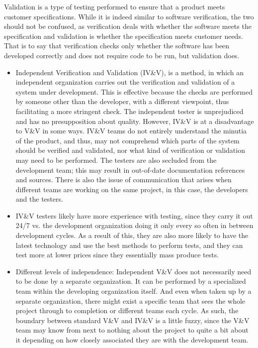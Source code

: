 \documentclass[journal, onecolumn]{IEEEtran}
\begin{document}
	Validation is a type of testing performed to ensure that a product meets customer specifications. While it is indeed similar to software verification, the two should not be confused, as verification deals with whether the software meets the specification and validation is whether the specification meets customer needs. That is to say that verification checks only whether the software has been developed correctly and does not require code to be run, but validation does.
	
	\begin{itemize}
		
		\item{Independent Verification and Validation (IV\&V), is a method, in which an independent organization carries out the verification and validation of a system under development.  This is effective because the checks are performed by someone other than the developer, with a different viewpoint, thus facilitating a more stringent check. The independent tester is unprejudiced and has no presupposition about quality.
			However, IV\&V is at a disadvantage to V\&V in some ways. IV\&V teams do not entirely understand the minutia of the product, and thus, may not comprehend which parts of the system should be verified and validated, nor what kind of verification or validation may need to be performed. The testers are also secluded from the development team; this may result in out-of-date documentation references and sources. There is also the issue of communication that arises when different teams are working on the same project, in this case, the developers and the testers.}
		
		\item{IV\&V testers likely have more experience with testing, since they carry it out 24/7 vs. the development organization doing it only every so often in between development cycles. As a result of this, they are also more likely to have the latest technology and use the best methods to perform tests, and they can test more at lower prices since they essentially mass produce tests.}
		
		\item{Different levels of independence: Independent V\&V does not necessarily need to be done by a separate organization. It can be performed by a specialized team within the developing organization itself. And even when taken up by a separate organization, there might exist a specific team that sees the whole project through to completion or different teams each cycle. As such, the boundary between standard V\&V and IV\&V is a little fuzzy, since the V\&V team may know from next to nothing about the project to quite a bit about it depending on how closely associated they are with the development team.}
	\end{itemize}
	\bigskip
	
\end{document}
